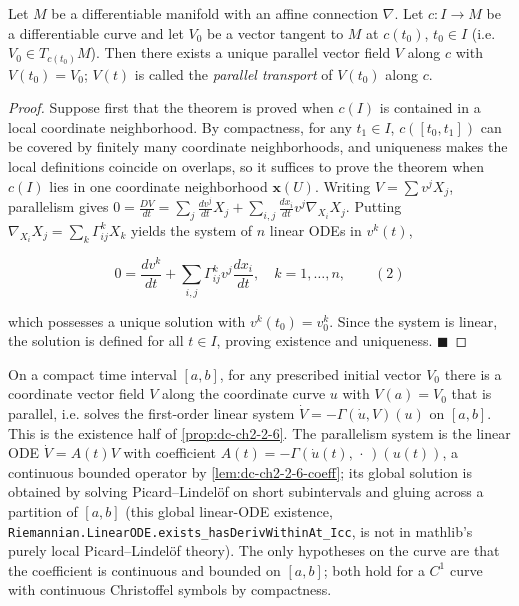 \begin{proposition}
  \label{prop:dc-ch2-2-6}
  \leanok
  Let $M$ be a differentiable manifold with an affine connection $\nabla$. Let
  $c:I\to M$ be a differentiable curve and let $V_0$ be a vector tangent to $M$ at
  $c(t_0)$, $t_0\in I$ (i.e. $V_0\in T_{c(t_0)}M$). Then there exists a unique
  parallel vector field $V$ along $c$ with $V(t_0)=V_0$; $V(t)$ is called the
  \emph{parallel transport} of $V(t_0)$ along $c$.
\end{proposition}
\begin{proof}
  \leanok
  Suppose first that the theorem is proved when $c(I)$ is contained in a
  local coordinate neighborhood. By compactness, for any $t_1\in I$,
  $c([t_0,t_1])$ can be covered by finitely many coordinate neighborhoods, and
  uniqueness makes the local definitions coincide on overlaps, so it suffices to
  prove the theorem when $c(I)$ lies in one coordinate neighborhood
  $\mathbf{x}(U)$. Writing $V=\sum v^j X_j$, parallelism gives
  $0=\frac{DV}{dt}=\sum_j\frac{dv^j}{dt}X_j+\sum_{i,j}\frac{dx_i}{dt}v^j\nabla_{X_i}X_j$.
  Putting $\nabla_{X_i}X_j=\sum_k\Gamma_{ij}^k X_k$ yields the system of $n$ linear
  ODEs in $v^k(t)$,
  
  $$
  0=\frac{dv^k}{dt}+\sum_{i,j}\Gamma_{ij}^k v^j\frac{dx_i}{dt},\quad k=1,\dots,n,\qquad(2)
  $$
  
  which possesses a unique solution with $v^k(t_0)=v_0^k$. Since the system is
  linear, the solution is defined for all $t\in I$, proving existence and
  uniqueness. $\blacksquare$
\end{proof}

\begin{lemma}
  \label{lem:dc-ch2-2-6-exist}
  \leanok
  On a compact time interval $[a,b]$, for any prescribed initial vector $V_0$ there is a
  coordinate vector field $V$ along the coordinate curve $u$ with $V(a)=V_0$ that is
  parallel, i.e. solves the first-order linear system $\dot V=-\Gamma(\dot u,V)(u)$ on
  $[a,b]$. This is the existence half of \cref{prop:dc-ch2-2-6}. The parallelism system is
  the linear ODE $\dot V=A(t)V$ with coefficient
  $A(t)=-\Gamma(\dot u(t),\,\cdot\,)(u(t))$, a continuous bounded operator by
  \cref{lem:dc-ch2-2-6-coeff}; its global solution is obtained by solving Picard--Lindelöf on
  short subintervals and gluing across a partition of $[a,b]$ (this global linear-ODE
  existence, \texttt{Riemannian.LinearODE.exists\_hasDerivWithinAt\_Icc}, is not in mathlib's
  purely local Picard--Lindelöf theory). The only hypotheses on the curve are that the
  coefficient is continuous and bounded on $[a,b]$; both hold for a $C^1$ curve with
  continuous Christoffel symbols by compactness.
\end{lemma}

